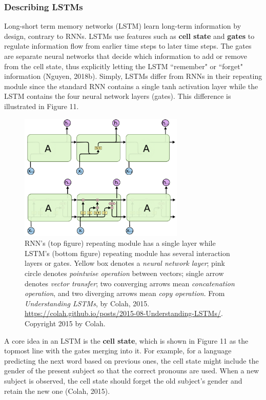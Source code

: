 \subsubsection{Describing LSTMs}

Long-short term memory networks (LSTM) learn long-term information by design, contrary to RNNs. LSTMs use features such as \textbf{cell state} and \textbf{gates} to regulate information flow from earlier time steps to later time steps. The gates are separate neural networks that decide which information to add or remove from the cell state, thus explicitly letting the LSTM ``remember" or ``forget" information (Nguyen, 2018b). Simply, LSTMs differ from RNNs in their repeating module since the standard RNN contains a single $\text{tanh}$ activation layer while the LSTM contains the four neural network layers (gates). This difference is illustrated in Figure 11.


\begin{figure}[h]
\centering
\includegraphics[width=0.7\textwidth]{imgs/rnn_vs_lstm_cells.png}
\caption{RNN's (top figure) repeating module has a single layer while LSTM's (bottom figure) repeating module has several interaction layers or gates. Yellow box denotes a \emph{neural network layer}; pink circle denotes \emph{pointwise operation} between vectors; single arrow denotes \emph{vector transfer}; two converging arrows mean \emph{concatenation operation}, and two diverging arrows mean \emph{copy operation}. From \emph{Understanding LSTMs}, by Colah, 2015. \url{https://colah.github.io/posts/2015-08-Understanding-LSTMs/}. Copyright 2015 by Colah.}
\end{figure}

A core idea in an LSTM is the \textbf{cell state}, which is shown in Figure 11 as the topmost line with the gates merging into it. For example, for a language predicting the next word based on previous ones, the cell state might include the gender of the present subject so that the correct pronouns are used. When a new subject is observed, the cell state should forget the old subject's gender and retain the new one (Colah, 2015). 


